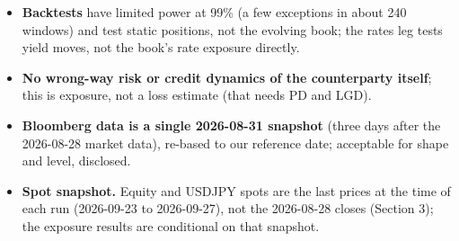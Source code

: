 \documentclass[11pt,letterpaper]{article}
\begin{document}
\begin{itemize}
\item \textbf{Backtests} have limited power at 99\% (a few exceptions in about 240 windows) and test static positions, not the evolving book; the rates leg tests yield moves, not the book's rate exposure directly.
\item \textbf{No wrong-way risk or credit dynamics of the counterparty itself}; this is exposure, not a loss estimate (that needs PD and LGD).
\item \textbf{Bloomberg data is a single 2026-08-31 snapshot} (three days after the 2026-08-28 market data), re-based to our reference date; acceptable for shape and level, disclosed.
\item \textbf{Spot snapshot.} Equity and USDJPY spots are the last prices at the time of each run (2026-09-23 to 2026-09-27), not the 2026-08-28 closes (Section 3); the exposure results are conditional on that snapshot.
\end{itemize}
\end{document}
